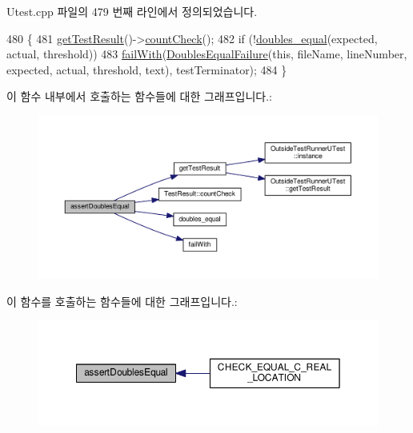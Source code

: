 Utest.\+cpp 파일의 479 번째 라인에서 정의되었습니다.


\begin{DoxyCode}
480 \{
481     \hyperlink{class_utest_shell_a34c525b685e30431750d9e355fdfff0c}{getTestResult}()->\hyperlink{class_test_result_a58577489a2418efb4c440761e533f2e7}{countCheck}();
482     \textcolor{keywordflow}{if} (!\hyperlink{_utest_8cpp_a895b194c86edb6bd4ba9d0c4d1e9f11a}{doubles\_equal}(expected, actual, threshold))
483         \hyperlink{class_utest_shell_ad50ae28f5ad9f1d224832cb1f89365a7}{failWith}(\hyperlink{class_doubles_equal_failure}{DoublesEqualFailure}(\textcolor{keyword}{this}, fileName, lineNumber, expected, 
      actual, threshold, text), testTerminator);
484 \}
\end{DoxyCode}


이 함수 내부에서 호출하는 함수들에 대한 그래프입니다.\+:
\nopagebreak
\begin{figure}[H]
\begin{center}
\leavevmode
\includegraphics[width=350pt]{class_utest_shell_a6bfdff112553fb1e8414903c2d4a0858_cgraph}
\end{center}
\end{figure}




이 함수를 호출하는 함수들에 대한 그래프입니다.\+:
\nopagebreak
\begin{figure}[H]
\begin{center}
\leavevmode
\includegraphics[width=350pt]{class_utest_shell_a6bfdff112553fb1e8414903c2d4a0858_icgraph}
\end{center}
\end{figure}


